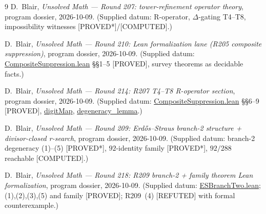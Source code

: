 \documentclass[11pt,a4paper]{article}
\theoremstyle{definition}
\begin{document}
\begin{thebibliography}{9}
D.~Blair,
\emph{Unsolved Math --- Round 207: tower-refinement operator theory},
program dossier, 2026-10-09.
(Supplied datum: R-operator, $\Delta$-gating T4--T8, impossibility
witnesses [PROVED*]/[COMPUTED].)

D.~Blair,
\emph{Unsolved Math --- Round 210: Lean formalization lane (R205
composite suppression)},
program dossier, 2026-10-09.
(Supplied datum: \url{CompositeSuppression.lean} \S\S1--5 [PROVED],
survey theorems as decidable facts.)

D.~Blair,
\emph{Unsolved Math --- Round 214: R207 T4--T8 R-operator section},
program dossier, 2026-10-09.
(Supplied datum: \url{CompositeSuppression.lean} \S\S6--9 [PROVED],
\url{digitMap}, \url{degeneracy_lemma}.)

D.~Blair,
\emph{Unsolved Math --- Round 209: Erd\H{o}s--Straus branch-2 structure
+ divisor-closed r-search},
program dossier, 2026-10-09.
(Supplied datum: branch-2 degeneracy (1)--(5) [PROVED*], $92$-identity
family [PROVED*], $92/288$ reachable [COMPUTED].)

D.~Blair,
\emph{Unsolved Math --- Round 218: R209 branch-2 + family theorem Lean
formalization},
program dossier, 2026-10-09.
(Supplied datum: \url{ESBranchTwo.lean}; (1),(2),(3),(5) and family
[PROVED]; R209~(4) [REFUTED] with formal counterexample.)

\end{thebibliography}
\end{document}
